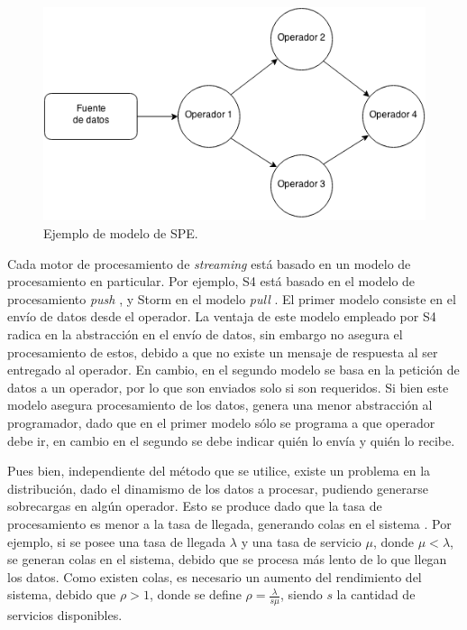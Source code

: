 \documentclass[12pt,letterpaper]{article}
\begin{document}
\begin{figure}[ht!]
  \centering
    \includegraphics[scale=0.5]{images/Grafo.png}
  \caption{Ejemplo de modelo de SPE.}
  \label{fig:grafo}
\end{figure}

Cada motor de procesamiento de \textsl{streaming} está basado en un modelo de procesamiento en particular. Por ejemplo, S4 está basado en el modelo de procesamiento \textsl{push} \cite{s4yahoo}, y Storm en el modelo \textsl{pull} \cite{stormtwitter}. El primer modelo consiste en el envío de datos desde el operador. La ventaja de este modelo empleado por S4 radica en la abstracción en el envío de datos, sin embargo no asegura el procesamiento de estos, debido a que no existe un mensaje de respuesta al ser entregado al operador. En cambio, en el segundo modelo se basa en la petición de datos a un operador, por lo que son enviados solo si son requeridos. Si bien este modelo asegura procesamiento de los datos, genera una menor abstracción al programador, dado que en el primer modelo sólo se programa a que operador debe ir, en cambio en el segundo se debe indicar quién lo envía y quién lo recibe.

Pues bien, independiente del método que se utilice, existe un problema en la distribución, dado el dinamismo de los datos a procesar, pudiendo generarse sobrecargas en algún operador. Esto se produce dado que la tasa de procesamiento es menor a la tasa de llegada, generando colas en el sistema \cite{queueingtheory}. Por ejemplo, si se posee una tasa de llegada $\lambda$ y una tasa de servicio $\mu$, donde $\mu < \lambda$, se generan colas en el sistema, debido que se procesa más lento de lo que llegan los datos. Como existen colas, es necesario un aumento del rendimiento del sistema, debido que $\rho > 1 $, donde se define $\rho = \frac{\lambda}{s\mu}$, siendo $s$ la cantidad de servicios disponibles.
\end{document}

